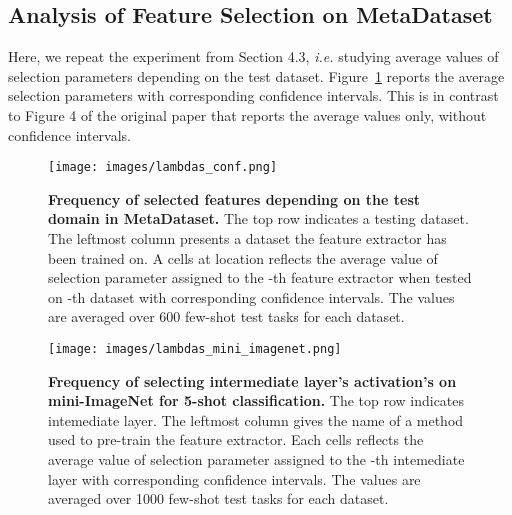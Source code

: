 \documentclass[runningheads]{llncs}
\begin{document}
\subsection{Analysis of Feature Selection on MetaDataset}
Here, we repeat the experiment from Section 4.3, \textit{i.e.} studying average values of
selection parameters  depending on the test dataset.
Figure~\ref{fig:lambdas_conf} reports the average selection parameters with
corresponding confidence intervals. This is in contrast to Figure 4 of the
original paper that reports the average values only, without confidence intervals.

\begin{figure}[t!]
\begin{center}
  \texttt{[image: images/lambdas\_conf.png]}
\end{center}
\caption{\textbf{Frequency of selected features depending on the test domain in MetaDataset.}
  The top row indicates a testing dataset. The leftmost column presents a dataset the
  feature extractor has been trained on. A cells at location  reflects
  the average value of selection parameter  assigned to the -th feature
  extractor when tested on -th dataset with corresponding  confidence
  intervals. The values are averaged over 600 few-shot test tasks for each
  dataset.}
\label{fig:lambdas_conf}
\end{figure}

\begin{figure}[t!]
\begin{center}
  \texttt{[image: images/lambdas\_mini\_imagenet.png]}
\end{center}
\caption{\textbf{Frequency of selecting intermediate layer's activation's on
    mini-ImageNet for 5-shot classification.}
  The top row indicates intemediate layer. The leftmost column gives the name of
  a method used to pre-train the feature extractor. Each cells reflects
  the average value of selection parameter  assigned to the -th
  intemediate layer with corresponding  confidence intervals. The values
  are averaged over 1000 few-shot test tasks for each dataset.}
\label{fig:lambdas_mini_imagenet}
\end{figure}
\end{document}
